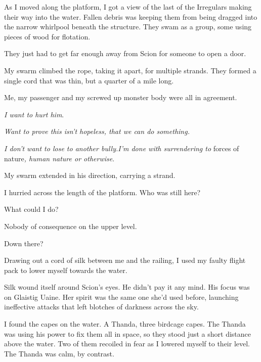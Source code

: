 As I moved along the platform, I got a view of the last of the Irregulars making their way into the water.  Fallen debris was keeping them from being dragged into the narrow whirlpool beneath the structure.  They swam as a group, some using pieces of wood for flotation.



They just had to get far enough away from Scion for someone to open a door.



My swarm climbed the rope, taking it apart, for multiple strands.  They formed a single cord that was thin, but a quarter of a mile long.



Me, my passenger and my screwed up monster body were all in agreement.



\emph{I want to hurt him}.



\emph{Want to prove this isn't hopeless, that we can do something.}



\emph{I don't want to lose to another bully.}\emph{I'm done with surrendering to }forces of nature\emph{, human nature or otherwise}.



My swarm extended in his direction, carrying a strand.



I hurried across the length of the platform.  Who was still here?



What could I do?



Nobody of consequence on the upper level.



Down there?



Drawing out a cord of silk between me and the railing, I used my faulty flight pack to lower myself towards the water.



Silk wound itself around Scion's eyes.  He didn't pay it any mind.  His focus was on Glaistig Uaine.  Her spirit was the same one she'd used before, launching ineffective attacks that left blotches of darkness across the sky.



I found the capes on the water.  A Thanda, three birdcage capes.  The Thanda was using his power to fix them all in space, so they stood just a short distance above the water.  Two of them recoiled in fear as I lowered myself to their level.  The Thanda was calm, by contrast.



